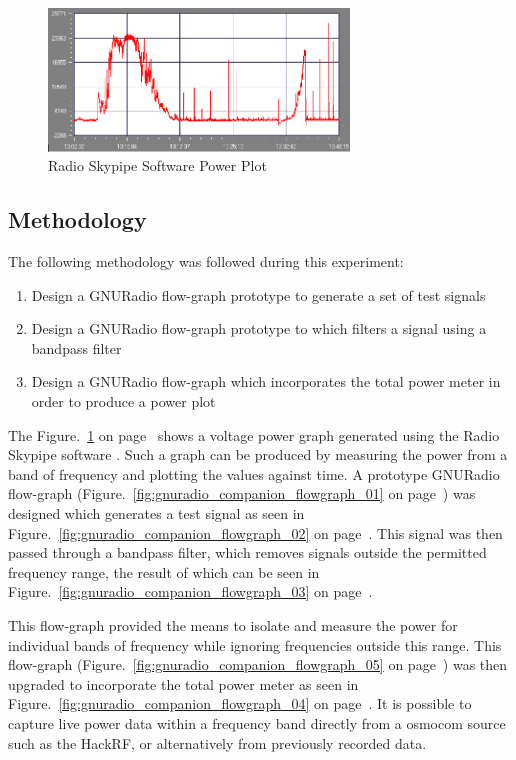 %
\begin{figure}[!htb]
	\centering
	\includegraphics[width=8cm]{images/18}
	\caption{Radio Skypipe Software Power Plot \citep{rsp-15}}
	\label{fig:radio_skypipe_power_plot}
\end{figure}
%

\subsection*{Methodology}
The following methodology was followed during this experiment:

\begin{enumerate}
	\item Design a GNURadio flow-graph prototype to generate a set of test signals
	\item Design a GNURadio flow-graph prototype to which filters a signal using a bandpass filter
	\item Design a GNURadio flow-graph which incorporates the total power meter in order to produce a power plot
\end{enumerate}

The Figure.~\ref{fig:radio_skypipe_power_plot} on page~\pageref{fig:radio_skypipe_power_plot} shows a voltage power graph generated using the Radio Skypipe software \citep{rsp-15}. Such a graph can be produced by measuring the power from a band of frequency and plotting the values against time. A prototype GNURadio flow-graph (Figure.~\ref{fig:gnuradio_companion_flowgraph_01} on page~\pageref{fig:gnuradio_companion_flowgraph_01}) was designed which generates a test signal as seen in Figure.~\ref{fig:gnuradio_companion_flowgraph_02} on page~\pageref{fig:gnuradio_companion_flowgraph_02}. This signal was then passed through a bandpass filter, which removes signals outside the permitted frequency range, the result of which can be seen in Figure.~\ref{fig:gnuradio_companion_flowgraph_03} on page~\pageref{fig:gnuradio_companion_flowgraph_03}.

This flow-graph provided the means to isolate and measure the power for individual bands of frequency while ignoring frequencies outside this range. This flow-graph (Figure.~\ref{fig:gnuradio_companion_flowgraph_05} on page~\pageref{fig:gnuradio_companion_flowgraph_05}) was then upgraded to incorporate the total power meter as seen in Figure.~\ref{fig:gnuradio_companion_flowgraph_04} on page~\pageref{fig:gnuradio_companion_flowgraph_04}. It is possible to capture live power data within a frequency band directly from a osmocom source such as the HackRF, or alternatively from previously recorded data. 

